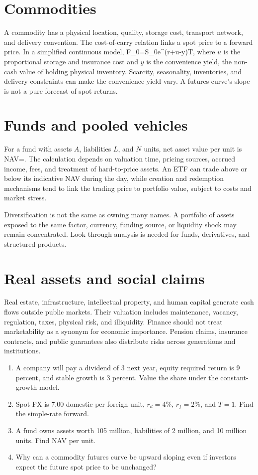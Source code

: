 \section{Commodities}
A commodity has a physical location, quality, storage cost, transport network, and delivery convention. The cost-of-carry relation links a spot price to a forward price. In a simplified continuous model,
  F_0=S_0e^{(r+u-y)T},
\closeformula
where $u$ is the proportional storage and insurance cost and $y$ is the convenience yield, the non-cash value of holding physical inventory. Scarcity, seasonality, inventories, and delivery constraints can make the convenience yield vary. A futures curve's slope is not a pure forecast of spot returns.

\section{Funds and pooled vehicles}
For a fund with assets $A$, liabilities $L$, and $N$ units, net asset value per unit is
  NAV=.
\closeformula
The calculation depends on valuation time, pricing sources, accrued income, fees, and treatment of hard-to-price assets. An ETF can trade above or below its indicative NAV during the day, while creation and redemption mechanisms tend to link the trading price to portfolio value, subject to costs and market stress.

Diversification is not the same as owning many names. A portfolio of assets exposed to the same factor, currency, funding source, or liquidity shock may remain concentrated. Look-through analysis is needed for funds, derivatives, and structured products.

\section{Real assets and social claims}
Real estate, infrastructure, intellectual property, and human capital generate cash flows outside public markets. Their valuation includes maintenance, vacancy, regulation, taxes, physical risk, and illiquidity. Finance should not treat marketability as a synonym for economic importance. Pension claims, insurance contracts, and public guarantees also distribute risks across generations and institutions.

\begin{exerciseblock}
\begin{enumerate}
  \item A company will pay a dividend of 3 next year, equity required return is 9 percent, and stable growth is 3 percent. Value the share under the constant-growth model.
  \item Spot FX is 7.00 domestic per foreign unit, $r_d=4\%$, $r_f=2\%$, and $T=1$. Find the simple-rate forward.
  \item A fund owns assets worth 105 million, liabilities of 2 million, and 10 million units. Find NAV per unit.
  \item Why can a commodity futures curve be upward sloping even if investors expect the future spot price to be unchanged?
\end{enumerate}
\end{exerciseblock}

